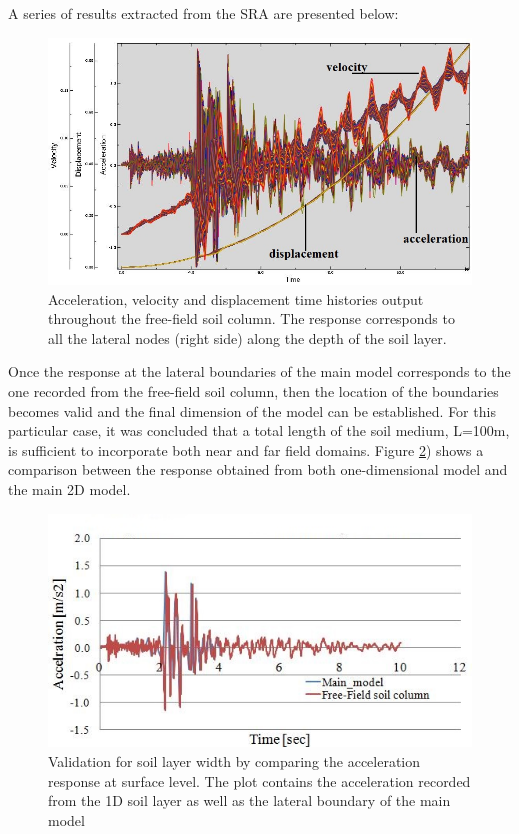 	A series of results extracted from the SRA are presented below:
		\begin{figure}[h!]
			\centering
			\includegraphics[width=0.8\linewidth]{"response_model_v12_FBC"}
			\caption{Acceleration, velocity and displacement time histories output throughout the free-field soil column. The response corresponds to all the lateral nodes (right side) along the depth of the soil layer.}
			\label{Acc_ff}
		\end{figure} 
		
	Once the response at the lateral boundaries of the main model corresponds to the one recorded from the free-field soil column, then the location of the boundaries becomes valid and the final dimension of the model can be established. For this particular case, it was concluded that a total length of the soil medium, L=100m, is sufficient to incorporate both near and far field domains. Figure \ref{validation}) shows a comparison between the response obtained from both one-dimensional model and the main 2D model.
		\begin{figure}[!h]
			\centering
			\includegraphics[width=0.7\linewidth]{"free-field2"}
			\caption{Validation for soil layer width by comparing the acceleration response at surface level. The plot contains the acceleration recorded from the 1D soil layer as well as the lateral boundary of the main model}
			\label{validation}
		\end{figure}			
			
